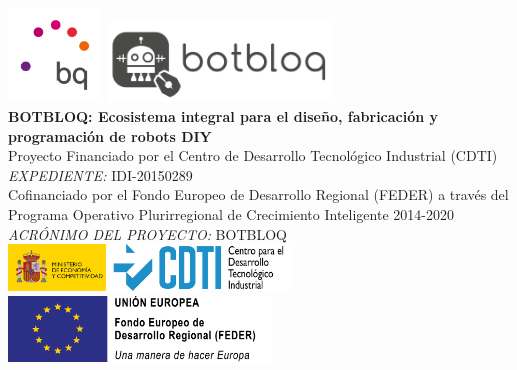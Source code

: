 \documentclass[12pt]{article} %
\begin{document}

\begin{titlepage}

\newcommand{\HRule}{\rule{\linewidth}{0.5mm}} %

\center %

\includegraphics[width=2.5cm]{logo}
\includegraphics[width=6cm]{logo_botbloq}\\[0.5cm]

{ \huge \bfseries BOTBLOQ: Ecosistema integral para el diseño, fabricación y programación de robots DIY}\\[0.5cm] %

\textsc Proyecto Financiado por el Centro de Desarrollo Tecnológico Industrial (CDTI) \\
\textsc{\small \emph{EXPEDIENTE:} IDI-20150289} \\
\textsc Cofinanciado por el Fondo Europeo de Desarrollo Regional (FEDER) a través del Programa Operativo Plurirregional de Crecimiento Inteligente 2014-2020 \\[0.5cm]
{\small \emph{ACRÓNIMO DEL PROYECTO:} BOTBLOQ}\\[0.5cm] %

\includegraphics[width=7.5cm]{CDTI}
\includegraphics[width=7cm]{FEDER}\\[1.0cm]


\end{titlepage}
\end{document}
